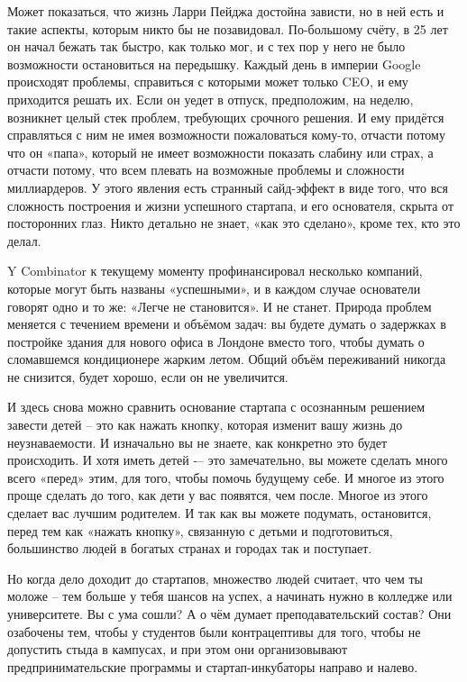 \documentclass[ebook,12pt,oneside,openany]{memoir}
\begin{document}
Может показаться, что жизнь Ларри Пейджа достойна зависти, но в ней
есть и такие аспекты, которым никто бы не позавидовал. По-большому
счёту, в 25 лет он начал бежать так быстро, как только мог, и с тех
пор у него не было возможности остановиться на передышку. Каждый день
в империи Google происходят проблемы, справиться с которыми может
только CEO, и ему приходится решать их. Если он уедет в отпуск,
предположим, на неделю, возникнет целый стек проблем, требующих
срочного решения. И ему придётся справляться с ним не имея возможности
пожаловаться кому-то, отчасти потому что он «папа», который не имеет
возможности показать слабину или страх, а отчасти потому, что всем
плевать на возможные проблемы и сложности миллиардеров. У этого
явления есть странный сайд-эффект в виде того, что вся сложность
построения и жизни успешного стартапа, и его основателя, скрыта от
посторонних глаз. Никто детально не знает, «как это сделано», кроме
тех, кто это делал. \newline

Y Combinator к текущему моменту профинансировал несколько компаний,
которые могут быть названы «успешными», и в каждом случае основатели
говорят одно и то же: «Легче не становится». И не станет. Природа
проблем меняется с течением времени и объёмом задач: вы будете думать
о задержках в постройке здания для нового офиса в Лондоне вместо того,
чтобы думать о сломавшемся кондиционере жарким летом. Общий объём
переживаний никогда не снизится, будет хорошо, если он не увеличится. \newline

И здесь снова можно сравнить основание стартапа с осознанным решением
завести детей – это как нажать кнопку, которая изменит вашу жизнь до
неузнаваемости. И изначально вы не знаете, как конкретно это будет
происходить. И хотя иметь детей -– это замечательно, вы можете сделать
много всего «перед» этим, для того, чтобы помочь будущему себе. И
многое из этого проще сделать до того, как дети у вас появятся, чем
после. Многое из этого сделает вас лучшим родителем. И так как вы
можете подумать, остановится, перед тем как «нажать кнопку», связанную
с детьми и подготовиться, большинство людей в богатых странах и
городах так и поступает. \newline

Но когда дело доходит до стартапов, множество людей считает, что чем
ты моложе – тем больше у тебя шансов на успех, а начинать нужно в
колледже или университете. Вы с ума сошли? А о чём думает
преподавательский состав? Они озабочены тем, чтобы у студентов были
контрацептивы для того, чтобы не допустить стыда в кампусах, и при
этом они организовывают предпринимательские программы и
стартап-инкубаторы направо и налево. \newline
\end{document}
